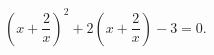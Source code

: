 \begin{ex}[type=equation]
	\begin{condition}
		 $\left(x + \dfrac{2}{x}\right)^2 + 2\left(x +\dfrac{2}{x}\right) -3 = 0.$
	\end{condition}
\end{ex}